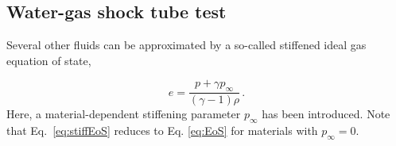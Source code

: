 \documentclass[final,3p,twocolumn,times]{elsarticle}
\begin{document}
\subsection{Water-gas shock tube test}
\label{subsec:water}

Several other fluids can be approximated by a so-called stiffened ideal gas
equation of state, 

\begin{equation}
    e = \frac{p+\gamma p_{\infty}}{(\gamma-1)\rho} \,.
    \label{eq:stiffEoS}
\end{equation}
%
Here, a material-dependent stiffening parameter $p_{\infty}$ has been
introduced. Note that Eq.\ \eqref{eq:stiffEoS} reduces to Eq. \eqref{eq:EoS} for
materials with $p_{\infty}=0$. 

\end{document}
